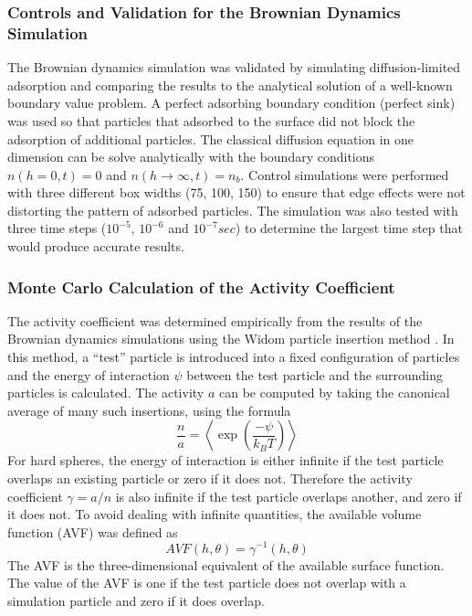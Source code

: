 \subsubsection{Controls and Validation for the Brownian Dynamics Simulation}

The Brownian dynamics simulation was validated by simulating diffusion-limited
adsorption and comparing the results to the analytical solution of
a well-known boundary value problem. A perfect adsorbing boundary
condition (perfect sink) was used so that particles that adsorbed
to the surface did not block the adsorption of additional particles.
The classical diffusion equation in one dimension can be solve analytically
with the boundary conditions $n(h=0,t)=0$ and $n(h\rightarrow\infty,t)=n_{b}$.
Control simulations were performed with three different box widths
(75, 100, 150) to ensure that edge effects were not distorting the
pattern of adsorbed particles. The simulation was also tested with
three time steps ($10^{-5}$, $10^{-6}$ and $10^{-7}sec$) to determine
the largest time step that would produce accurate results.


\subsubsection{Monte Carlo Calculation of the Activity Coefficient}

The activity coefficient was determined empirically from the results
of the Brownian dynamics simulations using the Widom particle insertion
method \cite{Widom1963,Dullens2005}. In this method, a {}``test''
particle is introduced into a fixed configuration of particles and
the energy of interaction $\psi$ between the test particle and the
surrounding particles is calculated. The activity $a$ can be computed
by taking the canonical average of many such insertions, using the
formula\begin{equation}
\frac{n}{a}=\left\langle \exp\left(\frac{-\psi}{k_{B}T}\right)\right\rangle \label{eq:Widom equation}\end{equation}
For hard spheres, the energy of interaction is either infinite if
the test particle overlaps an existing particle or zero if it does
not. Therefore the activity coefficient $\gamma=a/n$ is also infinite
if the test particle overlaps another, and zero if it does not. To
avoid dealing with infinite quantities, the available volume function
(AVF) was defined as \begin{equation}
AVF\left(h,\theta\right)=\gamma^{-1}\left(h,\theta\right)\label{eq:AVF}\end{equation}
The AVF is the three-dimensional equivalent of the available surface
function. The value of the AVF is one if the test particle does not
overlap with a simulation particle and zero if it does overlap. 

